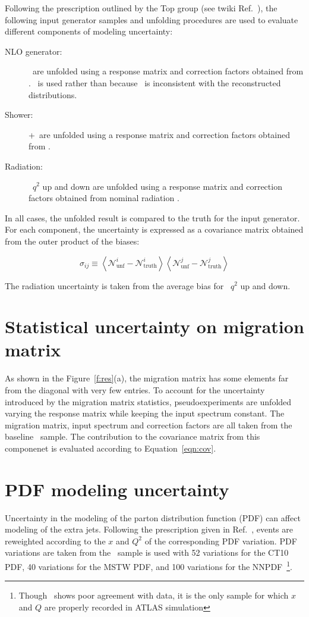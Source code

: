 Following the prescription outlined by the Top group (see twiki Ref.~\cite{topsys}), the following input generator samples and unfolding procedures are used to evaluate different components of modeling uncertainty:
\begin{description}
\item[NLO generator:] \madpy\ are unfolded using a response matrix and correction factors obtained from \powpy. \madpy\ is used rather than \mcnlohw because \mcnlohw\ is inconsistent with the reconstructed distributions.
\item[Shower:] \pow+\hw\ are unfolded using a response matrix and correction factors obtained from \powpy.
\item[Radiation:] \madpy\ $q^{2}$ up and down are unfolded using a response matrix and correction factors obtained from nominal radiation \madpy.
\end{description}
In all cases, the unfolded result is compared to the truth for the input generator. 
For each component, the uncertainty is expressed as a covariance matrix obtained from the outer product of the biases:

\begin{equation}
\sigma_{ij} \equiv \left \langle {\mathscr N}^{i}_{\textrm{unf}}-{\mathscr N}^{i}_{\textrm{truth}} \right \rangle \left \langle {\mathscr N}^{j}_{\textrm{unf}}-{\mathscr N}^{j}_{\textrm{truth}} \right \rangle
\end{equation}

The radiation uncertainty is taken from the average bias for \madpy\ $q^{2}$ up and down.

\section{Statistical uncertainty on migration matrix}
\label{ss:mcstats}
As shown in the Figure~\ref{f:res}(a), the migration matrix has some elements far from the diagonal with very few entries. To account for the uncertainty introduced by the migration matrix statistics, pseudoexperiments are unfolded varying the response matrix while keeping the input spectrum constant. The migration matrix, input spectrum and correction factors are all taken from the baseline \powpy\ sample. The contribution to the covariance matrix from this componenet is evaluated according to Equation~\ref{eqn:cov}.

\section{PDF modeling uncertainty}
\label{ss:pdf}
Uncertainty in the modeling of the parton distribution function (PDF) can affect modeling of the extra jets. Following the prescription given in Ref.~\cite{toppdf}, events are reweighted according to the $x$ and $Q^2$ of the corresponding PDF variation. PDF variations are taken from the \mcnlohw\ sample is used 
with 52 variations for the CT10 PDF, 40 variations for the MSTW PDF, and 100 variations for the NNPDF~\footnote{Though \mcnlohw\ shows poor agreement with data, it is the only sample for which $x$ and $Q$ are properly recorded in ATLAS simulation}. 


